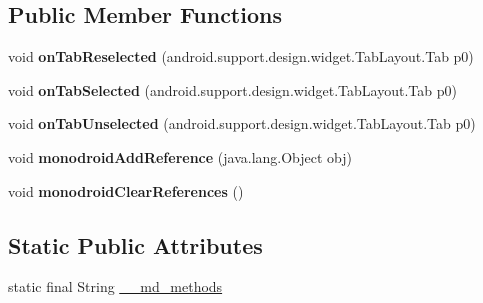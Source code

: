 \subsection*{Public Member Functions}
\begin{DoxyCompactItemize}
\item 
\mbox{\label{classmono_1_1android_1_1support_1_1design_1_1widget_1_1TabLayout__OnTabSelectedListenerImplementor_a7ec2a49269664d99cb90d0e2a341da9d}} 
void {\bfseries on\+Tab\+Reselected} (android.\+support.\+design.\+widget.\+Tab\+Layout.\+Tab p0)
\item 
\mbox{\label{classmono_1_1android_1_1support_1_1design_1_1widget_1_1TabLayout__OnTabSelectedListenerImplementor_ae5e2165f79658a8e289dff880f9eeeec}} 
void {\bfseries on\+Tab\+Selected} (android.\+support.\+design.\+widget.\+Tab\+Layout.\+Tab p0)
\item 
\mbox{\label{classmono_1_1android_1_1support_1_1design_1_1widget_1_1TabLayout__OnTabSelectedListenerImplementor_ac7d1b1a44df7eb306b35a80be1ef03bd}} 
void {\bfseries on\+Tab\+Unselected} (android.\+support.\+design.\+widget.\+Tab\+Layout.\+Tab p0)
\item 
\mbox{\label{classmono_1_1android_1_1support_1_1design_1_1widget_1_1TabLayout__OnTabSelectedListenerImplementor_ac366225a0b919fe8a7df0dce363784e6}} 
void {\bfseries monodroid\+Add\+Reference} (java.\+lang.\+Object obj)
\item 
\mbox{\label{classmono_1_1android_1_1support_1_1design_1_1widget_1_1TabLayout__OnTabSelectedListenerImplementor_ad3e27d3383e787abab61553c3ff8efba}} 
void {\bfseries monodroid\+Clear\+References} ()
\end{DoxyCompactItemize}
\subsection*{Static Public Attributes}
\begin{DoxyCompactItemize}
\item 
static final String \hyperlink{classmono_1_1android_1_1support_1_1design_1_1widget_1_1TabLayout__OnTabSelectedListenerImplementor_a69fdb2fbe45dfaa066204c67c40d6229}{\+\_\+\+\_\+md\+\_\+methods}
\end{DoxyCompactItemize}

